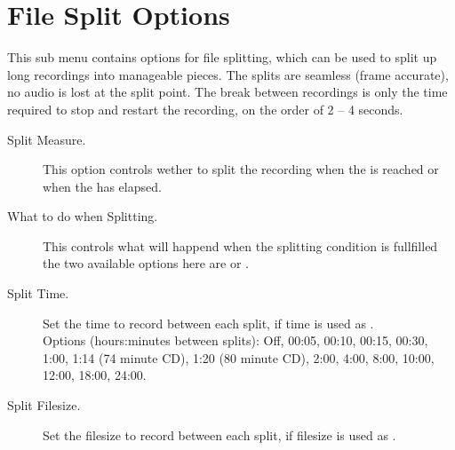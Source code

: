 
      
\section{File Split Options}
  This sub menu contains options for file splitting, which can be used to split
  up long recordings into manageable pieces. The splits are seamless (frame
  accurate), no audio is lost at the split point. The break between recordings
  is only the time required to stop and restart the recording, on the order of
  2 -- 4 seconds.
  \begin{description}
    \item[Split Measure.]
      This option controls wether to split the recording when the
       is reached or when the
       has elapsed.

    \item[What to do when Splitting.]
      This controls what will happend when the splitting condition is
      fullfilled the two available options here are
       or .

    \item[Split Time.]
      Set the time to record between each split, if time is used as
      .\\
      Options (hours:minutes between splits): Off, 00:05, 00:10, 00:15, 00:30,
      1:00, 1:14 (74 minute  CD), 1:20 (80 minute CD), 2:00, 4:00, 8:00, 10:00,
      12:00, 18:00, 24:00.

    \item[Split Filesize.]
      Set the filesize to record between each split, if filesize is used as
      .

  \end{description}

